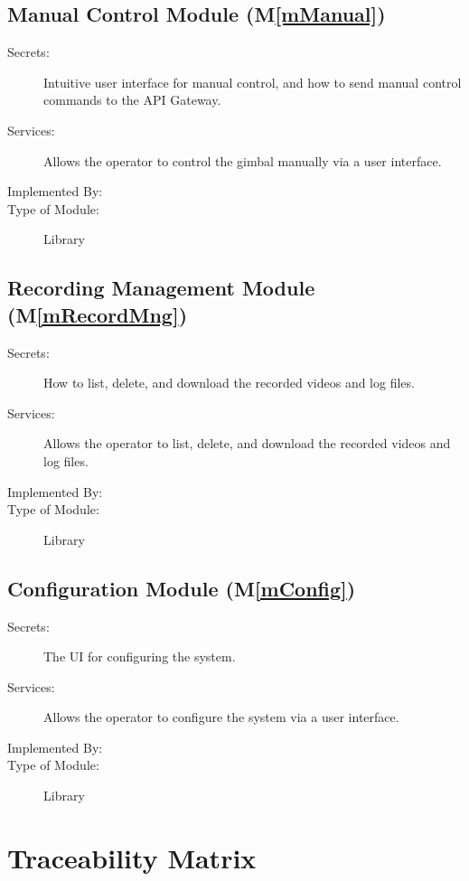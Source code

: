 \documentclass[12pt, titlepage]{article}
\newcommand{\mref}[1]{M\ref{#1}}
\begin{document}
\subsection{Manual Control Module (\mref{mManual})}

\begin{description}
  \item[Secrets:] Intuitive user interface for manual control, and how to send manual
        control commands to the API Gateway.
  \item[Services:] Allows the operator to control the gimbal manually via a user
        interface.
  \item[Implemented By:] \progname
  \item[Type of Module:] Library
\end{description}

\subsection{Recording Management Module (\mref{mRecordMng})}

\begin{description}
  \item[Secrets:] How to list, delete, and download the recorded videos and log files.
  \item[Services:] Allows the operator to list, delete, and download the recorded
        videos and log files.
  \item[Implemented By:] \progname
  \item[Type of Module:] Library
\end{description}

\subsection{Configuration Module (\mref{mConfig})}

\begin{description}
  \item[Secrets:] The UI for configuring the system.
  \item[Services:] Allows the operator to configure the system via a user interface.
  \item[Implemented By:] \progname
  \item[Type of Module:] Library
\end{description}

\section{Traceability Matrix} \label{SecTM}
\end{document}
